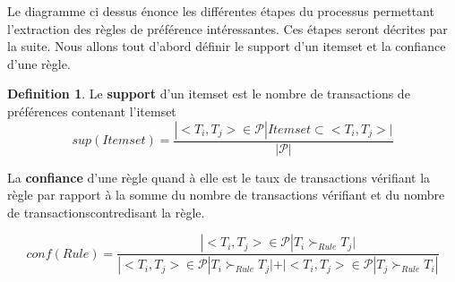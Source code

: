 \documentclass[11pt,a4paper]{article}
\theoremstyle{definition}
\newtheorem{defn}{Definition} %
\begin{document}
    
    \begin{center}
    
     \end{center}
    	
    \noindent Le diagramme ci dessus énonce les différentes étapes du processus permettant l'extraction des règles de préférence intéressantes. Ces étapes seront décrites par la suite. Nous allons tout d'abord définir le support d'un itemset et la confiance d'une règle.
    
    
   	\begin{defn}
   		Le \textbf{support} d'un itemset est le nombre de transactions de préférences contenant l'itemset \\
   		\[
   		sup(Itemset)=\frac{|<T_{i},T_{j}>\in \mathcal{P}|Itemset\subset <T_{i},T_{j}>|}{|\mathcal{P}|}\]
   		
   		La \textbf{confiance} d'une règle quand à elle est le taux de transactions vérifiant la règle par rapport à la somme du nombre de transactions vérifiant et du nombre de transactionscontredisant la règle.
   		
   		\[
   			conf(Rule)=\frac{|<T_{i},T_{j}>\in \mathcal{P}|T_{i}\succ_{Rule} T_{j}|}{|<T_{i},T_{j}>\in \mathcal{P}|T_{i}\succ_{Rule} T_{j}|+|<T_{i},T_{j}>\in \mathcal{P}| T_{j}\succ_{Rule} T_{i}|}
   		\]
   	\end{defn}
    
\end{document}
